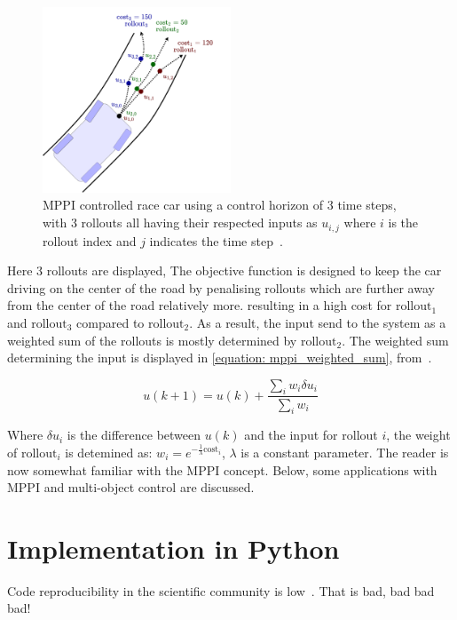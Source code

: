 \begin{figure}[h]
    \centering
    \includegraphics[width=0.5\textwidth]{figures/MPPI_car_with_rollouts.png}
    \caption{\acs{MPPI} controlled race car using a control horizon of 3 time steps, with 3 rollouts all having their respected inputs as $u_{i,j}$ where $i$ is the rollout index and $j$ indicates the time step~\cite{neuromorphictutorial_ltc21_2021}.}
    \label{figure: mppi_car_with_rollouts}
\end{figure}

Here 3 rollouts are displayed, The objective function is designed to keep the car driving on the center of the road by penalising rollouts which are further away from the center of the road relatively more. resulting in a high cost for $\text{rollout}_1$ and $\text{rollout}_3$ compared to $\text{rollout}_2$. As a result, the input send to the system as a weighted sum of the rollouts is mostly determined by $\text{rollout}_2$. The weighted sum determining the input is displayed in \cref{equation: mppi_weighted_sum}, from~\cite{neuromorphictutorial_ltc21_2021}.

\begin{equation}
u(k+1)=u(k)+\frac{\sum_{i} w_{i} \delta u_{i}}{\sum_{i} w_{i}}
\label{equation: mppi_weighted_sum}
\end{equation}

Where $\delta u_i$ is the difference between $u(k)$ and the input for rollout $i$, the weight of $\text{rollout}_i$ is detemined as: $w_{i}=e^{-\frac{1}{\lambda} \text{cost}_{i}}$, $\lambda$ is a constant parameter. The reader is now somewhat familiar with the \ac{MPPI} concept. Below, some applications with \ac{MPPI} and multi-object control are discussed.\bs

\chapter{Implementation in Python}%
\label{chap:code_implementation}


Code reproducibility in the scientific community is low~\cite{trisovic_largescale_2022}. That is bad, bad bad bad!

